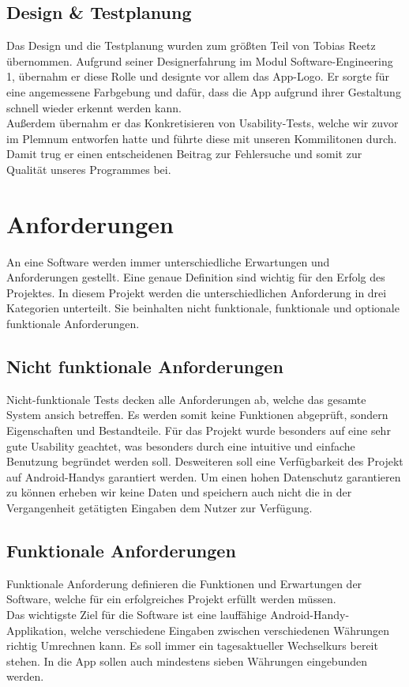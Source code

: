 \documentclass[conference]{IEEEtran}
\begin{document}
\subsection{Design \& Testplanung}
Das Design und die Testplanung wurden zum größten Teil von Tobias Reetz übernommen. Aufgrund seiner Designerfahrung im Modul Software-Engineering 1, übernahm er diese Rolle und designte vor allem das App-Logo. Er sorgte für eine angemessene Farbgebung und dafür, dass die App aufgrund ihrer Gestaltung schnell wieder erkennt werden kann. \\
Außerdem übernahm er das Konkretisieren von Usability-Tests, welche wir zuvor im Plemnum entworfen hatte und führte diese mit unseren Kommilitonen durch. Damit trug er einen entscheidenen Beitrag zur Fehlersuche und somit zur Qualität unseres Programmes bei.

\section{Anforderungen}
An eine Software werden immer unterschiedliche Erwartungen und Anforderungen gestellt. Eine genaue Definition sind wichtig für den Erfolg des Projektes. In diesem Projekt werden die unterschiedlichen Anforderung in drei Kategorien unterteilt. Sie beinhalten nicht funktionale, funktionale und optionale funktionale Anforderungen.

\subsection{Nicht funktionale Anforderungen}
Nicht-funktionale Tests decken alle Anforderungen ab, welche das gesamte System ansich betreffen. Es werden somit keine Funktionen abgeprüft, sondern Eigenschaften und Bestandteile. Für das Projekt wurde besonders auf eine sehr gute Usability geachtet, was besonders durch eine intuitive und einfache Benutzung begründet werden soll.
Desweiteren soll eine Verfügbarkeit des Projekt auf Android-Handys garantiert werden. Um einen hohen Datenschutz garantieren zu können erheben wir keine Daten und speichern auch nicht die in der Vergangenheit getätigten Eingaben dem Nutzer zur Verfügung. 

\subsection{Funktionale Anforderungen}
Funktionale Anforderung definieren die Funktionen und Erwartungen der Software, welche für ein erfolgreiches Projekt erfüllt werden müssen. \\
Das wichtigste Ziel für die Software ist eine lauffähige Android-Handy-Applikation, welche verschiedene Eingaben zwischen verschiedenen Währungen richtig Umrechnen kann. Es soll immer ein tagesaktueller Wechselkurs bereit stehen. In die App sollen auch mindestens sieben Währungen eingebunden werden.
\end{document}
